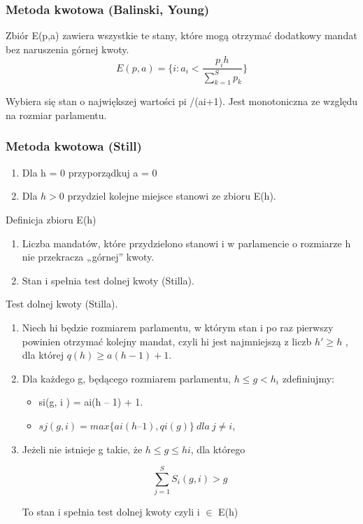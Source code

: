\documentclass[12pt,a4paper]{article}
\begin{document}
\subsubsection{Metoda kwotowa (Balinski, Young)}

Zbiór E(p,a) zawiera wszystkie te stany, które mogą otrzymać dodatkowy mandat bez naruszenia górnej kwoty.
\begin{equation}
E(p,a)=\lbrace i:a_i <\frac{p_ih}{\sum \limits_{k=1}^{S} p_k} \rbrace
\end{equation}

Wybiera się stan o największej wartości pi /(ai+1). Jest monotoniczna ze względu na rozmiar parlamentu. 

\subsubsection{Metoda kwotowa (Still)}
\begin{enumerate}
\item Dla h = 0 przyporządkuj a = 0
\item Dla $h > 0$ przydziel kolejne miejsce stanowi ze
zbioru E(h).
\end{enumerate}

Definicja zbioru E(h)
\begin{enumerate}
\item  Liczba mandatów, które przydzielono stanowi i w parlamencie o rozmiarze h nie przekracza „górnej” kwoty.
\item Stan i spełnia test dolnej kwoty (Stilla).
\end{enumerate}

Test dolnej kwoty (Stilla).
\begin{enumerate}
\item Niech hi będzie rozmiarem parlamentu, w którym stan i po raz pierwszy powinien
otrzymać kolejny mandat, czyli hi jest najmniejszą z liczb 
$h' \geq h $ , dla której  $q (h )  \geq a  (h -1 )+1. $ 
\item Dla każdego g, będącego rozmiarem parlamentu, $h \leq g < h_i $ zdefiniujmy:
\begin{itemize}
\item si(g, i ) = ai(h – 1) + 1.
\item $sj(g, i ) = max \lbrace ai(h – 1), qi(g) \rbrace \  dla \  j \neq i $,
\end{itemize}
\item Jeżeli nie istnieje g takie, że $h \leqslant g \leqslant hi $, dla którego 

\begin{equation}
\sum \limits_{j=1}^{S} S_i(g,i)>g
\end{equation}



To stan i spełnia test dolnej kwoty czyli i $ \in $ E(h)
\end{enumerate}
\end{document}
